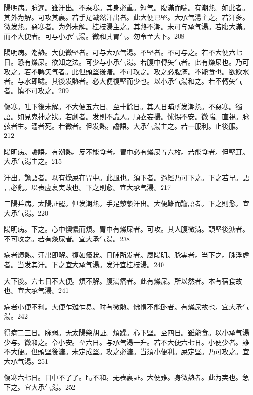 \documentclass[b5paper,twoside,zihao=-4,UTF8]{ctexbook}
\begin{document}
陽明病。脉遲。雖汗出。不惡寒。其身必重。短气。腹滿而喘。有潮熱。如此者。其外为解。可攻其裏。若手足濈然汗出者。此大便已堅。{大}承气湯主之。若汗多。微发熱。惡寒者。为外未解。{桂枝湯主之。}其熱不潮。未可与承气湯。若腹大滿。而不大便者。可与小承气湯。微和其胃气。勿令至大下。208

陽明病。潮熱。大便微堅者。可与{大}承气湯。不堅者。不可与之。若不大便六七日。恐有燥屎。欲知之法。可少与小承气湯。若腹中轉矢气者。此有燥屎也。乃可攻之。若不轉矢气者。此但頭堅後溏。不可攻之。攻之必腹滿。不能食也。欲飲水者。与水即噦。其後发熱者。必大便復堅而少也。以小承气湯和之。若不轉矢气者。慎不可攻之。209

傷寒。吐下後未解。不大便五六日。至十餘日。其人日晡所发潮熱。不惡寒。獨語。如見鬼{神之}狀。若劇者。发則不識人。順衣妄撮。怵惕不安。微喘。直視。脉弦者生。濇者死。{若}微者。但发熱。譫語。{大}承气湯主之。若一服利。止後服。212

陽明病。譫語。有潮熱。反不能食者。{胃中}必有燥屎五六枚。若能食者。但堅耳。{大}承气湯主之。215

汗出。譫語者。以有燥屎在胃中。此風也。{須下者。}過經乃可下之。下之若早。語言必亂。以表虗裏実故也。下之則愈。宜{大}承气湯。217

二陽并病。太陽証罷。但发潮熱。手足漐漐汗出。大便難而譫語者。下之則愈。宜{大}承气湯。220

陽明病。下之。心中懊憹而煩。胃中有燥屎者。可攻。其人腹微滿。頭堅後溏者。不可攻之。若有燥屎者。宜{大}承气湯。238

病者煩熱。汗出即解。復如瘧狀。日晡所发者。屬陽明。脉実者。当下之。脉浮虗者。当发其汗。下之宜{大}承气湯。发汗宜桂枝湯。240

大下後。六七日不大便。煩不解。腹滿痛者。此有燥屎。所以然者。本有宿食故也。宜{大}承气湯。241

病者小便不利。大便乍難乍易。时有微熱。怫㥜不能卧者。有燥屎故也。宜{大}承气湯。242

得病二三日。脉弱。无太陽柴胡証。煩躁。心下堅。至四日。雖能食。以{小}承气湯少与。微和之。令小安。至六日。与承气湯一升。若不大便六七日。小便少者。雖不大便。但頭堅後溏。未定成堅。攻之必溏。当須小便利。屎定堅。乃可攻之。宜{大}承气湯。251

傷寒六七日。目中不了了。睛不和。无表{裏}証。大便難。身微熱者。此为実也。急下之。宜{大}承气湯。252
\end{document}
